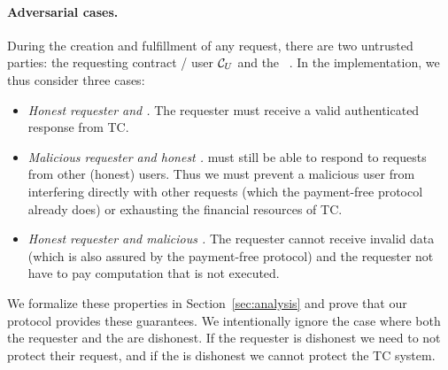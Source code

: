\paragraph{Adversarial cases.}

During the creation and fulfillment of any request, there are two untrusted parties: the requesting contract / user ${\cal C}_U$ and the \tc~\medname. In the \tc implementation, we thus consider three cases:

\begin{itemize}
  \setlength{\itemsep}{2pt}
  \setlength{\parskip}{0pt}
  \setlength{\parsep}{0pt}
  \item {\it Honest requester and \medname.}
    The requester must receive a valid authenticated response from TC.

  \item {\it Malicious requester and honest \medname.}
    \tc must still be able to respond to requests from other (honest) users.
    Thus we must prevent a malicious user from interfering directly with other requests (which the payment-free protocol already does)
    or exhausting the financial resources of TC.

  \item {\it Honest requester and malicious \medname.}
    The requester cannot receive invalid data (which is also assured by the payment-free protocol)
    and the requester not have to pay computation that is not executed.
\end{itemize}
We formalize these properties in Section~\ref{sec:analysis} and prove that our protocol provides these guarantees.
We intentionally ignore the case where both the requester and the \medname are dishonest.
If the requester is dishonest we need to not protect their request, and if the \medname is dishonest we cannot protect the TC system.




